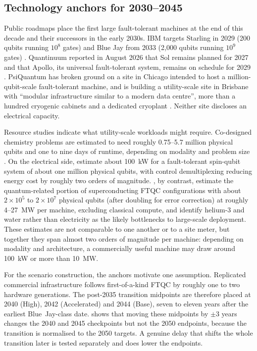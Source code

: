 \documentclass[11pt,a4paper]{article}
\begin{document}
\subsection{Technology anchors for 2030--2045}
Public roadmaps place the first large fault-tolerant machines at the end of this decade and their successors in the early 2030s. IBM targets Starling in 2029 (200 qubits running $10^8$ gates) and Blue Jay from 2033 (2,000 qubits running $10^9$ gates) \citep{ibm2026roadmap}. Quantinuum reported in August 2026 that Sol remains planned for 2027 and that Apollo, its universal fault-tolerant system, remains on schedule for 2029 \citep{quantinuum2026q2}. PsiQuantum has broken ground on a site in Chicago intended to host a million-qubit-scale fault-tolerant machine, and is building a utility-scale site in Brisbane with ``modular infrastructure similar to a modern data centre'', more than a hundred cryogenic cabinets and a dedicated cryoplant \citep{psiquantum2025chicago,bea2025psiq}. Neither site discloses an electrical capacity.

Resource studies indicate what utility-scale workloads might require. Co-designed chemistry problems are estimated to need roughly 0.75--5.7 million physical qubits and one to nine days of runtime, depending on modality and problem size \citep{gratsea2025codesign}. On the electrical side, \citet{santos2026spin} estimate about 100~kW for a fault-tolerant spin-qubit system of about one million physical qubits, with control demultiplexing reducing energy cost by roughly two orders of magnitude. \citet{mccollum2026futures}, by contrast, estimate the quantum-related portion of superconducting FTQC configurations with about $2\times10^5$ to $2\times10^7$ physical qubits (after doubling for error correction) at roughly 4--27~MW per machine, excluding classical compute, and identify helium-3 and water rather than electricity as the likely bottlenecks to large-scale deployment. These estimates are not comparable to one another or to a site meter, but together they span almost two orders of magnitude per machine: depending on modality and architecture, a commercially useful machine may draw around 100~kW or more than 10~MW.

For the scenario construction, the anchors motivate one assumption. Replicated commercial infrastructure follows first-of-a-kind FTQC by roughly one to two hardware generations. The post-2035 transition midpoints are therefore placed at 2040 (High), 2042 (Accelerated) and 2044 (Base), seven to eleven years after the earliest Blue~Jay-class date.  shows that moving these midpoints by $\pm3$ years changes the 2040 and 2045 checkpoints but not the 2050 endpoints, because the transition is normalised to the 2050 targets. A genuine delay that shifts the whole transition later is tested separately and does lower the endpoints.
\end{document}
